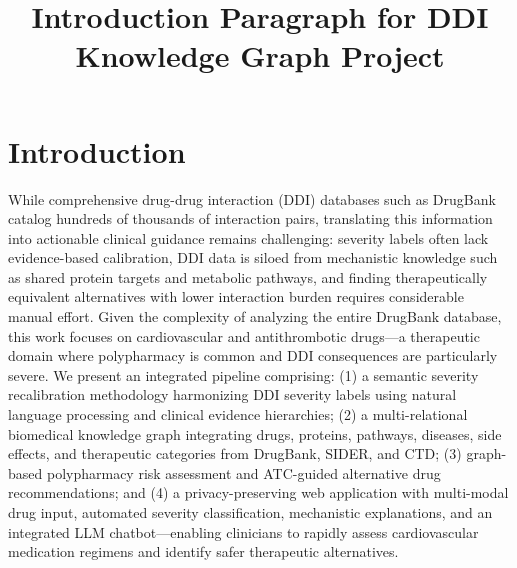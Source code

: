 \documentclass[11pt,a4paper]{article}
\title{\textbf{Introduction Paragraph for DDI Knowledge Graph Project}}
\author{}
\date{}
\begin{document}
\maketitle

\section*{Introduction}

While comprehensive drug-drug interaction (DDI) databases such as DrugBank catalog hundreds of thousands of interaction pairs, translating this information into actionable clinical guidance remains challenging: severity labels often lack evidence-based calibration, DDI data is siloed from mechanistic knowledge such as shared protein targets and metabolic pathways, and finding therapeutically equivalent alternatives with lower interaction burden requires considerable manual effort. Given the complexity of analyzing the entire DrugBank database, this work focuses on cardiovascular and antithrombotic drugs---a therapeutic domain where polypharmacy is common and DDI consequences are particularly severe. We present an integrated pipeline comprising: (1) a semantic severity recalibration methodology harmonizing DDI severity labels using natural language processing and clinical evidence hierarchies; (2) a multi-relational biomedical knowledge graph integrating drugs, proteins, pathways, diseases, side effects, and therapeutic categories from DrugBank, SIDER, and CTD; (3) graph-based polypharmacy risk assessment and ATC-guided alternative drug recommendations; and (4) a privacy-preserving web application with multi-modal drug input, automated severity classification, mechanistic explanations, and an integrated LLM chatbot---enabling clinicians to rapidly assess cardiovascular medication regimens and identify safer therapeutic alternatives.
\end{document}
